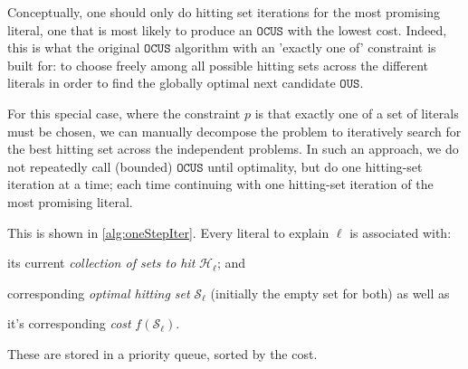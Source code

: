 \documentclass[twoside,11pt]{article}
\newcommand\m[1]{\mathcal{#1}}
\newcommand\comment[1]{\marginpar{\tiny #1}}
\renewcommand\comment[1]{#1}
\newcommand{\emilio}[1]{{\comment{\color{red}Emilio: #1}}}
\newcommand{\bart}[1]{{\comment{\color{OliveGreen}Bart: #1}}}
\newcommand\setstohit{\ensuremath{\m{H} }\xspace}
\newcommand\mm[1]{\ensuremath{#1}\xspace}
\newcommand\call[1]{\mm{\texttt{#1}}}
\newcommand\ohs{\mm{\call{OptHittingSet}}}
\newcommand\omus{\mm{\call{OUS}}}
\newcommand\comus{\mm{\call{OCUS}}}
\newcommand\ousb{\mm{\call{OCUS\_Bound}}}
\newcommand\iterativeonestep{\ensuremath{\call{Explain-One-Step-OCUS-Split}}\xspace}
\begin{document}
Conceptually, one should only do hitting set iterations for the most promising literal, one that is most likely to produce an \comus with the lowest cost. 
Indeed, this is what the original \comus algorithm with an 'exactly one of' constraint is built for: to choose freely among all possible hitting sets across the different literals in order to find the globally optimal next candidate \omus. 

For this special case, where the constraint $p$ is that exactly one of a set of literals must be chosen, we can manually decompose the problem to iteratively search for the best hitting set across the independent problems.
In such an approach, we do not repeatedly call (bounded) \comus until optimality, but do one hitting-set iteration at a time; each time continuing with one hitting-set iteration of the most promising literal. 

This is shown in \cref{alg:oneStepIter}. Every literal to explain $\ell$ is associated with:~\begin{inparaenum}[(1)]
	\item its current \emph{collection of sets to hit} ${\setstohit_{\ell}}$; and
	\item corresponding \emph{optimal hitting set} ${\m{S}_\ell}$ (initially the empty set for both) as well as
	\item it's corresponding \emph{cost} ${f(\m{S}_\ell)}$.
\end{inparaenum}
These are stored in a priority queue, sorted by the cost. %
\end{document}
